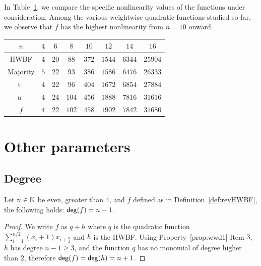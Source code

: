 \documentclass[11pt]{llncs}
\begin{document}
In Table~\ref{table:comparisonsNL}, we compare the specific nonlinearity values of the functions under consideration. Among the various weightwise quadratic functions studied so far, we observe that $f$ has the highest nonlinearity from $n=10$ onward.



\begin{table}[h]
	\centering
	\begin{tabular}{|c| c|c|c|c| c|c|c|}
		\hline
		$n$ & $4$  & $6$  & $8$  &  $10$ & $12$ & $14$ & $16$  \\
	\hline	
    	HWBF   & $4$  & $20$  & $88$  &  $372$ & $1544$ & $6344$ & $25904$  \\  	
		\hline
Majority   & $5$  & $22$  & $93$  &  $386$ & $1586$ & $6476$ & $26333$  \\
\hline
    	t~\cite{DAM:MeaOza24}   & $4$  & $22$  & $96$  &  $404$ & $1672$ & $6854$ & $27884$\\
\hline	
    	u~\cite{DAM:MeaOza24}   & $4$  & $24$  & $104$  &  $456$ & $1888$ & $7816$ & $31616$ \\
\hline				
		
		$f$  & $4$  & $22$  & $102$  &  $458$ & $1902$ & $7842$ & $31680$\\
\hline
	\end{tabular}
	\label{table:comparisonsNL}
\end{table}





\section{Other parameters}


\subsection{Degree}

\begin{proposition}
	Let $n\in \mathbb{N}$ be even, greater than $4$, and $f$ defined as in Definition~\ref{def:revHWBF}, the following holds: $\mathsf{deg}(f)= n-1$.
\end{proposition}
\begin{proof}
	We write $f$ as $q+h$ where $q$ is the quadratic function $\sum_{i=1}^{n/2} (x_i+1) x_{i+\frac{n}{2}}$ and $h$ is the HWBF.
	Using Property~\ref{prop:wwd1} Item $3$, $h$ has degree $n-1\ge 3$, and the function $q$ has no monomial of degree higher than $2$, therefore $\mathsf{deg}(f)=\mathsf{deg}(h)=n+1$.
	
	
\end{proof}
\end{document}
